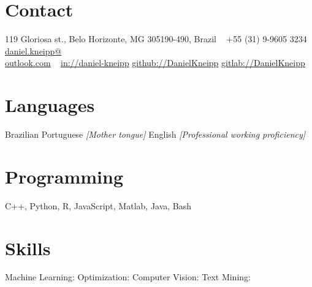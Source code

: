 \documentclass[a4paper]{cv-friggeri-x}
\begin{document}


\begin{aside} %
\section{Contact}
\pin \hfill 119 Gloriosa st.,
Belo Horizonte, MG 
305190-490, Brazil
~
{\Large\textcolor{gray}{\Mobilefone}} \hfill +55 (31) 9-9605 3234
{\Large\textcolor{gray}{\Letter}} \hfill \href{mailto:daniel.kneipp@outlook.com}{daniel.kneipp@\\outlook.com}
~
\llogo \hfill \href{https://www.linkedin.com/in/daniel-kneipp/}{in://daniel-kneipp}
\githublogo \hfill \href{https://github.com/DanielKneipp}{github://DanielKneipp}
\gitlablogo \hfill \href{https://gitlab.com/DanielKneipp}{gitlab://DanielKneipp}
\section{Languages}
Brazilian Portuguese \hspace{5mm}\null
\textit{\footnotesize{[Mother tongue]}}
English  \hspace{5mm}\null
\textit{\footnotesize{[Professional working proficiency]}}
\section{Programming}
C++, Python, R, JavaScript,
Matlab, Java, Bash
~
\section{Skills}
Machine Learning: \hspace{5mm}\null
{} 
Optimization:     \hspace{5mm}\null  
{}
Computer Vision:  \hspace{5mm}\null
{}
Text Mining:      \hspace{5mm}\null
{}
\end{aside}
\end{document}
